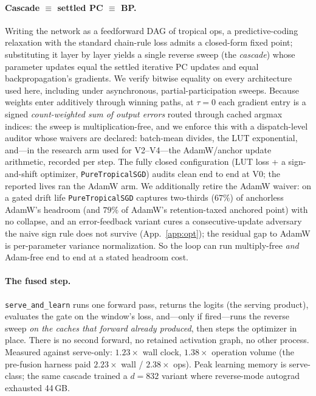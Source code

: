 \documentclass{article}
\begin{document}
\paragraph{Cascade $\equiv$ settled PC $\equiv$ BP.} Writing the network as a
feedforward DAG of tropical ops, a predictive-coding relaxation with the
standard chain-rule loss admits a closed-form fixed point; substituting it
layer by layer yields a single reverse sweep (the \emph{cascade}) whose
parameter updates equal the settled iterative PC updates and equal
backpropagation's gradients. We verify bitwise equality on every
architecture used here, including under asynchronous, partial-participation
sweeps. Because weights enter additively through winning paths, at
$\tau{=}0$ each gradient entry is a signed \emph{count-weighted sum of output
errors} routed through cached argmax indices: the sweep is
multiplication-free, and we enforce this with a dispatch-level auditor whose
waivers are declared: batch-mean divides, the LUT exponential, and---in the
research arm used for V2--V4---the AdamW/anchor update arithmetic, recorded
per step. The fully closed configuration (LUT loss + a sign-and-shift optimizer,
\texttt{PureTropicalSGD}) audits clean end to end at V0; the reported lives ran
the AdamW arm. We additionally retire the AdamW waiver: on a gated drift life
\texttt{PureTropicalSGD} captures two-thirds ($67\%$) of anchorless AdamW's
headroom (and $79\%$ of AdamW's retention-taxed anchored point) with no collapse,
and an error-feedback variant cures a consecutive-update adversary the naive sign
rule does not survive (App.~\ref{app:opt}); the residual gap to AdamW is
per-parameter variance normalization. So the loop can run multiply-free
\emph{and} Adam-free end to end at a stated headroom cost.

\paragraph{The fused step.} \texttt{serve\_and\_learn} runs one forward pass,
returns the logits (the serving product), evaluates the gate on the window's
loss, and---only if fired---runs the reverse sweep \emph{on the caches that
forward already produced}, then steps the optimizer in place. There is no
second forward, no retained activation graph, no other process. Measured
against serve-only: $1.23\times$ wall clock, $1.38\times$ operation volume
(the pre-fusion harness paid $2.23\times$ wall / $2.38\times$ ops). Peak learning memory is
serve-class; the same cascade trained a $d{=}832$ variant where reverse-mode
autograd exhausted 44\,GB.
\end{document}

